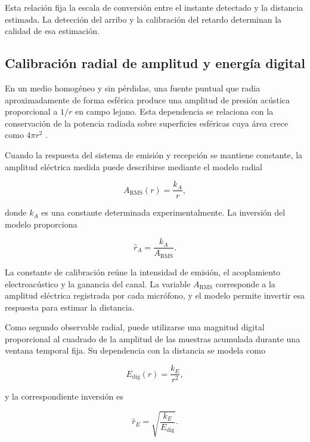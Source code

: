 Esta relación fija la escala de conversión entre el instante detectado
y la distancia estimada. La detección del arribo y la calibración del
retardo determinan la calidad de esa estimación.

\subsection{Calibración radial de amplitud y energía digital}

En un medio homogéneo y sin pérdidas, una fuente puntual que radia
aproximadamente de forma esférica produce una amplitud de presión
acústica proporcional a $1/r$ en campo lejano. Esta dependencia se
relaciona con la conservación de la potencia radiada sobre superficies
esféricas cuya área crece como $4\pi r^2$
\cite{kinsler2000fundamentals,morse1968theoretical}.

Cuando la respuesta del sistema de emisión y recepción se mantiene
constante, la amplitud eléctrica medida puede describirse mediante el
modelo radial

\begin{equation}
    A_{\mathrm{RMS}}(r) = \frac{k_A}{r},
    \label{eq:modelo_amplitud_radial}
\end{equation}

donde $k_A$ es una constante determinada experimentalmente. La inversión
del modelo proporciona

\begin{equation}
    \hat r_A = \frac{k_A}{A_{\mathrm{RMS}}}.
    \label{eq:inversion_amplitud}
\end{equation}

La constante de calibración reúne la intensidad de emisión, el
acoplamiento electroacústico y la ganancia del canal. La variable
$A_{\mathrm{RMS}}$ corresponde a la amplitud eléctrica registrada por
cada micrófono, y el modelo permite invertir esa respuesta para estimar
la distancia.

Como segundo observable radial, puede utilizarse una magnitud digital
proporcional al cuadrado de la amplitud de las muestras acumulada durante
una ventana temporal fija. Su dependencia con la distancia se modela
como

\begin{equation}
    E_{\mathrm{dig}}(r) = \frac{k_E}{r^2},
    \label{eq:modelo_energia_radial}
\end{equation}

y la correspondiente inversión es

\begin{equation}
    \hat r_E = \sqrt{\frac{k_E}{E_{\mathrm{dig}}}}.
    \label{eq:inversion_energia}
\end{equation}

